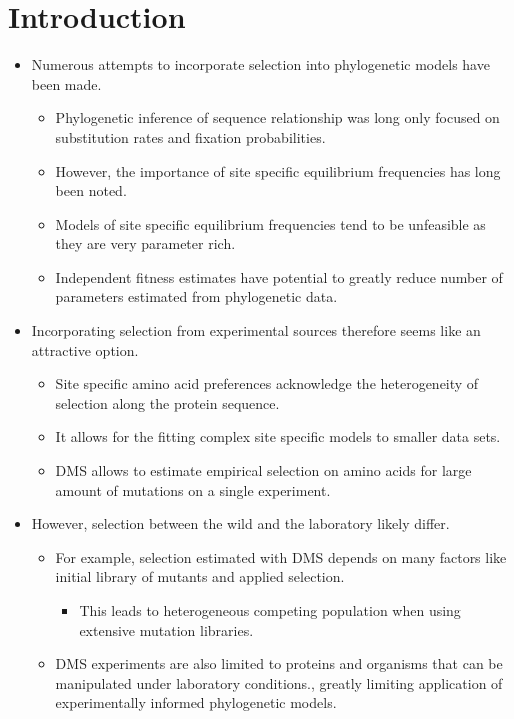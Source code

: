 \documentclass[12pt]{article}
\begin{document}
\section*{Introduction}
\begin{itemize}
	\item Numerous attempts to incorporate selection into phylogenetic models have been made.
	\begin{itemize}
		\item Phylogenetic inference of sequence relationship was long only focused on substitution rates and fixation probabilities.
		\item However, the importance of site specific equilibrium frequencies has long been noted.
		\item Models of site specific equilibrium frequencies tend to be unfeasible as they are very parameter rich.
		\item Independent fitness estimates have potential to greatly reduce number of parameters estimated from phylogenetic data.
	\end{itemize}
	\item Incorporating selection from experimental sources therefore seems like an attractive option.
	\begin{itemize}
		\item Site specific amino acid preferences acknowledge the heterogeneity of selection along the protein sequence.
		\item It allows for the fitting complex site specific models to smaller data sets.
		\item DMS allows to estimate empirical selection on amino acids for large amount of mutations on a single experiment.
	\end{itemize}
	\item However, selection between the wild and the laboratory likely differ.
	\begin{itemize}
		\item For example, selection estimated with DMS depends on many factors like initial library of mutants and applied selection.
		\begin{itemize}
			\item This leads to heterogeneous competing population when using extensive mutation libraries.
		\end{itemize}
		\item DMS experiments are also limited to proteins and organisms that can be manipulated under laboratory conditions., greatly limiting application of experimentally informed phylogenetic models.
	\end{itemize}


\end{itemize}
\end{document}
